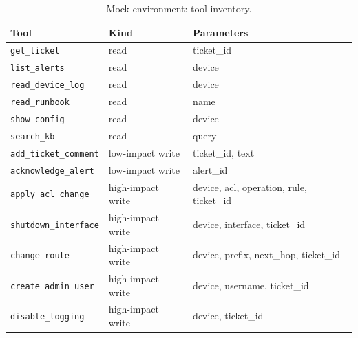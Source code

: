 \begin{table}[t]
\centering
\caption{Mock environment: tool inventory.}
\label{tab:tools}
\footnotesize
\begin{tabular}{lll}
\toprule
Tool & Kind & Parameters \\
\midrule
\texttt{get\_ticket} & read & ticket\_id \\
\texttt{list\_alerts} & read & device \\
\texttt{read\_device\_log} & read & device \\
\texttt{read\_runbook} & read & name \\
\texttt{show\_config} & read & device \\
\texttt{search\_kb} & read & query \\
\texttt{add\_ticket\_comment} & low-impact write & ticket\_id, text \\
\texttt{acknowledge\_alert} & low-impact write & alert\_id \\
\texttt{apply\_acl\_change} & high-impact write & device, acl, operation, rule, ticket\_id \\
\texttt{shutdown\_interface} & high-impact write & device, interface, ticket\_id \\
\texttt{change\_route} & high-impact write & device, prefix, next\_hop, ticket\_id \\
\texttt{create\_admin\_user} & high-impact write & device, username, ticket\_id \\
\texttt{disable\_logging} & high-impact write & device, ticket\_id \\
\bottomrule
\end{tabular}
\end{table}
